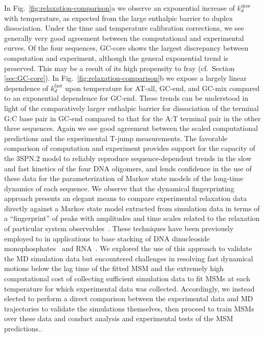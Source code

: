 \documentclass[journal=jpcbfk,manuscript=article]{achemso}
\newcommand*{\rood}[1]{{#1}}
\begin{document}
In Fig.~\ref{fig:relaxation-comparison}a we observe an exponential increase of $k_d^\mathrm{slow}$ with temperature, as expected from the large enthalpic barrier to duplex dissociation.\cite{Craig1971RelaxationOligonucleotides,Porschke1971CooperativeTransition,Williams1989LaserDGCATGC} Under the time and temperature calibration corrections, we see generally very good agreement between the computational and experimental curves. Of the four sequences, GC-core shows the largest discrepancy between computation and experiment, although the general exponential trend is preserved. This may be a result of its high propensity to fray (cf.\ Section \ref{sec:GC-core}). In Fig.~\ref{fig:relaxation-comparison}b we expose a largely linear dependence of $k_d^\mathrm{fast}$ upon temperature for AT-all, GC-end, and GC-mix compared to an exponential dependence for GC-end. These trends can be understood in light of the comparatively larger enthalpic barrier for dissociation of the terminal G:C base pair in GC-end compared to that for the A:T terminal pair in the other three sequences. Again we see good agreement between the scaled computational predictions and the experimental T-jump measurements. The favorable comparison of computation and experiment provides support for the capacity of the 3SPN.2 model to reliably reproduce sequence-dependent trends in the slow and fast kinetics of the four DNA oligomers\rood{, and lends confidence in the use of these data for the parameterization of Markov state models of the long-time dynamics of each sequence. We observe that the dynamical fingerprinting approach presents an elegant means to compare experimental relaxation data directly against a Markov state model extracted from simulation data in terms of a ``fingerprint'' of peaks with amplitudes and time scales related to the relaxation of particular system observables~\citep{Noe2011DynamicalExperiments}. These techniques have been previously employed to in applications to base stacking of DNA dinucleoside monophosphates~\citep{Remington2019MolecularKinetics} and RNA~\citep{Pinamonti2017}. We explored the use of this approach to validate the MD simulation data but encountered challenges in resolving fast dynamical motions below the lag time of the fitted MSM and the extremely high computational cost of collecting sufficient simulation data to fit MSMs at each temperature for which experimental data was collected. Accordingly, we instead elected to perform a direct comparison between the experimental data and MD trajectories to validate the simulations themselves, then proceed to train MSMs over these data and conduct analysis and experimental tests of the MSM predictions.}.
\end{document}
